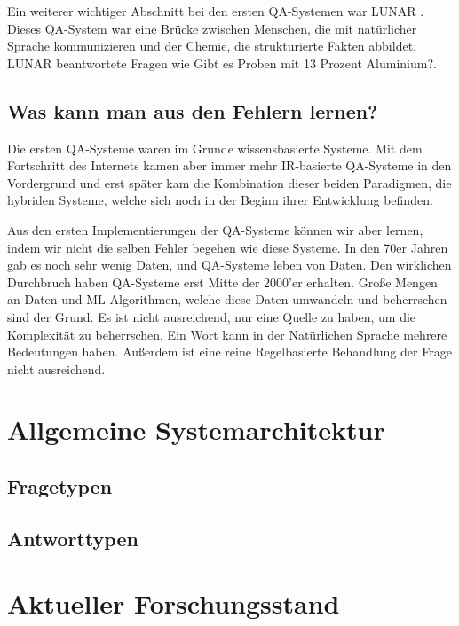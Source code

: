 \documentclass[
        ngerman,
        paper=a4,
        numbers=noendperiod,
]{scrreprt}
\begin{document}
Ein weiterer wichtiger Abschnitt bei den ersten QA-Systemen war \glqq LUNAR\grqq{} \citep{Woods1978SemanticsAnswering}. Dieses QA-System war eine Brücke zwischen Menschen, die mit natürlicher Sprache kommunizieren und der Chemie, die strukturierte Fakten abbildet. LUNAR beantwortete  Fragen wie \glqq Gibt es Proben mit 13 Prozent Aluminium?\grqq{}. 

\subsection{Was kann man aus den Fehlern lernen?}
Die ersten QA-Systeme waren im Grunde wissensbasierte Systeme. Mit dem Fortschritt des Internets kamen aber immer mehr IR-basierte QA-Systeme in den Vordergrund und erst später kam die Kombination dieser beiden Paradigmen, die hybriden Systeme, welche sich noch in der Beginn ihrer Entwicklung befinden. 

Aus den ersten Implementierungen der QA-Systeme können wir aber lernen, indem wir nicht die selben Fehler begehen wie diese Systeme. In den 70er Jahren gab es noch sehr wenig Daten, und QA-Systeme leben von Daten. Den wirklichen Durchbruch haben QA-Systeme erst Mitte der 2000'er erhalten. Große Mengen an Daten und ML-Algorithmen, welche diese Daten umwandeln und beherrschen sind der Grund. Es ist nicht ausreichend, nur eine Quelle zu haben, um die Komplexität zu beherrschen. Ein Wort kann in der Natürlichen Sprache mehrere Bedeutungen haben. Außerdem ist eine reine Regelbasierte Behandlung der Frage nicht ausreichend.

\section{Allgemeine Systemarchitektur} %
\subsection{Fragetypen}
\subsection{Antworttypen}
\section{Aktueller Forschungsstand} %
\end{document}
